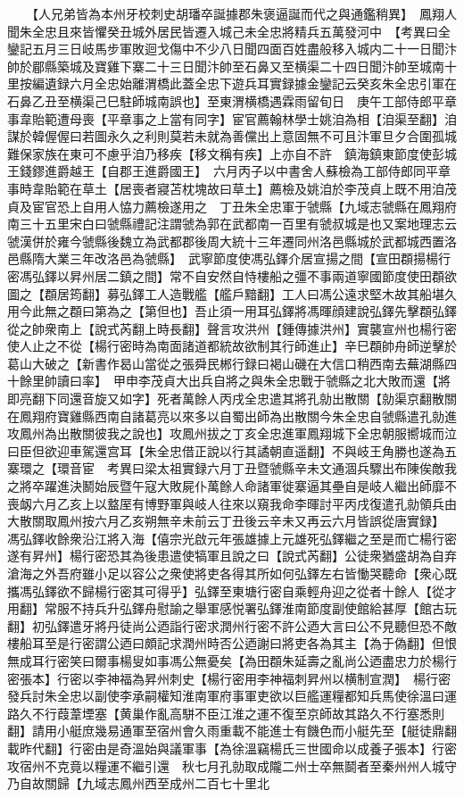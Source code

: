 　　【人兄弟皆為本州牙校刺史胡璠卒誕據郡朱褒逼誕而代之與通鑑稍異】　鳳翔人聞朱全忠且來皆懼癸丑城外居民皆遷入城己未全忠將精兵五萬發河中　【考異曰全鑾記五月三日岐馬步軍敗迴戈傷中不少八日聞四面百姓盡般移入城内二十一日聞汴帥於郿縣築城及寶雞下寨二十三日聞汴帥至石鼻又至横渠二十四日聞汴帥至城南十里按編遺録六月全忠始離渭橋此蓋全忠下遊兵耳實録據金鑾記云癸亥朱全忠引軍在石鼻乙丑至横渠己巳駐師城南誤也】至東渭横橋遇霖雨留旬日　庚午工部侍郎平章事韋貽範遭母喪【平章事之上當有同字】宦官薦翰林學士姚洎為相【洎渠至翻】洎謀於韓偓偓曰若圖永久之利則莫若未就為善儻出上意固無不可且汴軍旦夕合圍孤城難保家族在東可不慮乎洎乃移疾【移文稱有疾】上亦自不許　鎮海鎮東節度使彭城王錢鏐進爵越王【自郡王進爵國王】　六月丙子以中書舍人蘇檢為工部侍郎同平章事時韋貽範在草土【居喪者寢苫枕塊故曰草土】薦檢及姚洎於李茂貞上既不用洎茂貞及宦官恐上自用人恊力薦檢遂用之　丁丑朱全忠軍于虢縣【九域志虢縣在鳳翔府南三十五里宋白曰虢縣禮記注謂虢為郭在武都南一百里有虢叔城是也又案地理志云虢漢併於雍今虢縣後魏立為武都郡後周大統十三年遷同州洛邑縣城於武都城西置洛邑縣隋大業三年改洛邑為虢縣】　武寧節度使馮弘鐸介居宣揚之間【宣田頵揚楊行密馮弘鐸以昇州居二鎮之間】常不自安然自恃樓船之彊不事兩道寧國節度使田頵欲圖之【頵居筠翻】募弘鐸工人造戰艦【艦戶黯翻】工人曰馮公遠求堅木故其船堪久用今此無之頵曰第為之【第但也】吾止須一用耳弘鐸將馮暉顔建說弘鐸先擊頵弘鐸從之帥衆南上【說式芮翻上時長翻】聲言攻洪州【鍾傳據洪州】實襲宣州也楊行密使人止之不從【楊行密時為南面諸道都統故欲制其行師進止】辛巳頵帥舟師逆擊於葛山大破之【新書作曷山當從之張舜民郴行録曰褐山磯在大信口稍西南去蕪湖縣四十餘里帥讀曰率】　甲申李茂貞大出兵自將之與朱全忠戰于虢縣之北大敗而還【將即亮翻下同還音旋又如字】死者萬餘人丙戌全忠遣其將孔勍出散關【勍渠京翻散關在鳳翔府寶雞縣西南自諸葛亮以來多以自蜀出師為出散關今朱全忠自虢縣遣孔勍進攻鳳州為出散關彼我之說也】攻鳳州拔之丁亥全忠進軍鳳翔城下全忠朝服嚮城而泣曰臣但欲迎車駕還宫耳【朱全忠借正說以行其譎朝直遥翻】不與岐王角勝也遂為五寨環之【環音宦　考異曰梁太祖實録六月丁丑暨虢縣辛未文通涸兵驟出布陳俟敵我之將卒躍進決鬭始辰暨午寇大敗屍仆萬餘人命諸軍徙寨逼其壘自是岐人繼出師靡不喪衂六月乙亥上以盩厔有博野軍與岐人往來以窺我命李暉討平丙戌復遣孔勍領兵由大散關取鳳州按六月乙亥朔無辛未前云丁丑後云辛未又再云六月皆誤從唐實録】　馮弘鐸收餘衆沿江將入海【僖宗光啟元年張雄據上元雄死弘鐸繼之至是而亡楊行密遂有昇州】楊行密恐其為後患遣使犒軍且說之曰【說式芮翻】公徒衆猶盛胡為自弃滄海之外吾府雖小足以容公之衆使將吏各得其所如何弘鐸左右皆慟哭聽命【衆心既攜馮弘鐸欲不歸楊行密其可得乎】弘鐸至東塘行密自乘輕舟迎之從者十餘人【從才用翻】常服不持兵升弘鐸舟慰諭之舉軍感悦署弘鐸淮南節度副使館給甚厚【館古玩翻】初弘鐸遣牙將丹徒尚公迺詣行密求潤州行密不許公迺大言曰公不見聽但恐不敵樓船耳至是行密謂公迺曰頗記求潤州時否公迺謝曰將吏各為其主【為于偽翻】但恨無成耳行密笑曰爾事楊叟如事馮公無憂矣【為田頵朱延壽之亂尚公迺盡忠力於楊行密張本】行密以李神福為昇州刺史【楊行密用李神福刺昇州以横制宣潤】　楊行密發兵討朱全忠以副使李承嗣權知淮南軍府事軍吏欲以巨艦運糧都知兵馬使徐溫曰運路久不行葭葦堙塞【黄巢作亂高駢不臣江淮之運不復至京師故其路久不行塞悉則翻】請用小艇庶幾易通軍至宿州會久雨重載不能進士有饑色而小艇先至【艇徒鼎翻載昨代翻】行密由是奇溫始與議軍事【為徐溫竊楊氏三世國命以成養子張本】行密攻宿州不克竟以糧運不繼引還　秋七月孔勍取成隴二州士卒無鬬者至秦州州人城守乃自故關歸【九域志鳳州西至成州二百七十里北